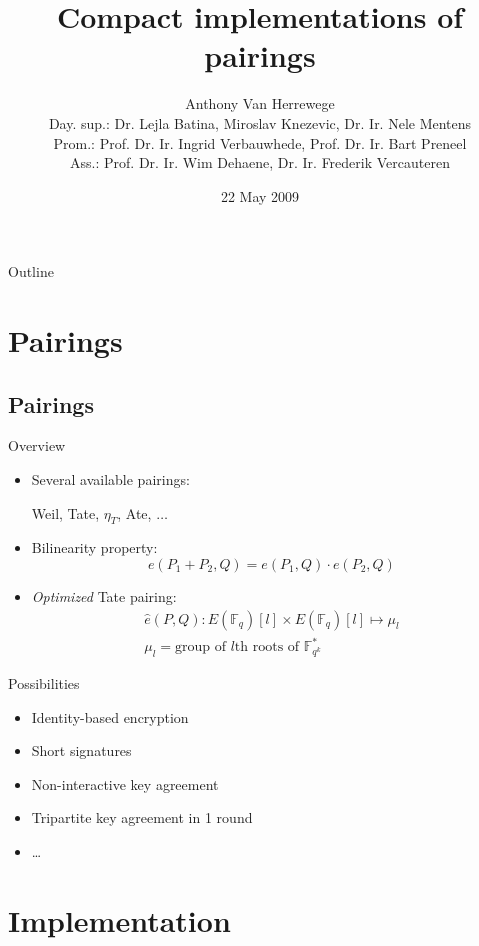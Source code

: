 \documentclass[svgnames]{beamer}
\title{Compact implementations of pairings}
\author[Anthony Van Herrewege]{Anthony Van Herrewege\\[2em]
\footnotesize Day. sup.: Dr. Lejla Batina, Miroslav Knezevic, Dr. Ir. Nele Mentens\\
Prom.: Prof. Dr. Ir. Ingrid Verbauwhede, Prof. Dr. Ir. Bart Preneel\\
Ass.: Prof. Dr. Ir. Wim Dehaene, Dr. Ir. Frederik Vercauteren}
\date{22 May 2009}
\begin{document}
\frame{\titlepage}

\section[Outline]{}
\begin{frame}{Outline}
  \tableofcontents
\end{frame}

\section{Pairings}
\subsection*{Pairings}
\begin{frame}{Overview}
	\begin{itemize}
		\item Several available pairings:
			\begin{center}Weil, \alert{Tate}, $\eta _T$, Ate, $\ldots$\end{center}
		
		\item	Bilinearity property:
			\[ e(P_1 + P_2, Q) = e(P_1, Q) \cdot e(P_2, Q) \]
	
		\item \emph{Optimized} Tate pairing:	
			\[\begin{gathered}
				\hat{e}(P, Q) : E(\mathbb{F}_q)[l] \times E(\mathbb{F}_q)[l] \mapsto \mu _l \\
				\mu _l = \text{group of $l$th roots of } \mathbb{F}_{q^k}^*
			\end{gathered}\]
	\end{itemize}
\end{frame}

\begin{frame}{Possibilities}
	\begin{itemize}
		\item Identity-based encryption
		\item Short signatures
		\item Non-interactive key agreement
		\item Tripartite key agreement in 1 round
		\item \ldots
	\end{itemize}
\end{frame}

\section{Implementation}
\end{document}
